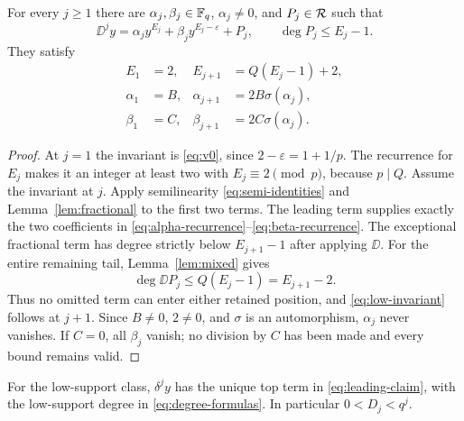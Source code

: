 \begin{proposition}\label{prop:low-state}
For every $j\ge1$ there are $\alpha_j,\beta_j\in\mathbb F_q$,
$\alpha_j\ne0$, and $P_j\in\mathcal R$ such that
\begin{equation}\label{eq:low-invariant}
 \DD^j y=\alpha_jy^{E_j}
       +\beta_jy^{E_j-\varepsilon}+P_j,
 \qquad \deg P_j\le E_j-1.
\end{equation}
They satisfy
\begin{align}
 E_1&=2,& E_{j+1}&=Q(E_j-1)+2,\label{eq:E-recurrence}\\
 \alpha_1&=B,& \alpha_{j+1}&=2B\sigma(\alpha_j),\label{eq:alpha-recurrence}\\
 \beta_1&=C,& \beta_{j+1}&=2C\sigma(\alpha_j).\label{eq:beta-recurrence}
\end{align}
\end{proposition}

\begin{proof}
At $j=1$ the invariant is \eqref{eq:v0}, since
$2-\varepsilon=1+1/p$. The recurrence for $E_j$ makes it an
integer at least two with $E_j\equiv2\pmod p$, because $p\mid Q$.
Assume the invariant at $j$. Apply semilinearity
\eqref{eq:semi-identities} and Lemma~\ref{lem:fractional} to the
first two terms. The leading term supplies exactly the two
coefficients in \eqref{eq:alpha-recurrence}--\eqref{eq:beta-recurrence}.
The exceptional fractional term has degree strictly below
$E_{j+1}-1$ after applying $\DD$. For the entire remaining tail,
Lemma~\ref{lem:mixed} gives
\[
 \deg\DD P_j\le Q(E_j-1)=E_{j+1}-2.
\]
Thus no omitted term can enter either retained position, and
\eqref{eq:low-invariant} follows at $j+1$. Since $B\ne0$,
$2\ne0$, and $\sigma$ is an automorphism, $\alpha_j$ never
vanishes. If $C=0$, all $\beta_j$ vanish; no division by $C$
has been made and every bound remains valid.
\end{proof}

\begin{proposition}\label{prop:descent}
For the low-support class, $\delta^j y$ has the unique top term
in \eqref{eq:leading-claim}, with the low-support degree in
\eqref{eq:degree-formulas}. In particular $0<D_j<q^j$.
\end{proposition}

